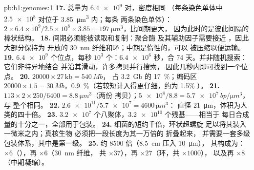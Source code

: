 \begin{solution}{pb:b1:genomes:1}
\textbf{17.}  总量为 $\num{6.4e9}$ 对，密度相同
（每条染色单体中 $\num{2.5e8}$ 对位于 \qty{3.85}{\micro m^3} 内；每条
两条染色单体）：$2\times 6.4\times 10^9/2.5\times 10^8\times
3.85 = \qty{197}{\micro m^3}$，比间期更大，
因为此时的是彼此间隔的棒状结构。
\textbf{18.} 间期必须能被读取和复制：聚合酶
及其辅助因子需要接近 ，因此大部分保持为
开放的 \qty{30}{nm} 纤维和环；中期是惰性的，可以
被压缩以便运输。
\textbf{19.} $\num{6.4e9}$ 个位点，每秒 $10^3$ 个：$\num{6.4e6}$
秒，合 74 天。并非随机搜索：它们非特异地结合 
并沿其滑动，许多拷贝并行搜索，
因此几秒内即可找到一个位点。
\textbf{20.} $\num{20000}\times 27\,\mathrm{kb} = \qty{540}{Mb}$，
占 \qty{3.2}{Gb} 的 \qty{17}{\%}；编码区 $\num{20000}\times 1.5 =
\qty{30}{Mb}$，\qty{0.9}{\%}（若较短计入得更仔细，约为 1.5\%
）。
\textbf{21.} $113\times 2\times 250/6400 = \qty{8.8}{\micro m^3}$（两份
拷贝）；$\num{5e8}/8.8 = \qty{5.7e7}{bp/\micro m^3}$，与
整个相同。
\textbf{22.} $\num{2.6e11}/\num{5.7e7} = \qty{4600}{\micro m^3}$：
直径 \qty{21}{\micro m}，体积为人类的四十倍。
\textbf{23.} $\num{3.2e7}$ 个八聚体，$\num{3.2e10}$ 个残基——相当于
每日合成量的十分之一，全部用于包装。
\textbf{24.} 细菌的短约千倍，环状超螺旋
足以将其装入一微米之内；真核生物
必须把一段长度为其一万倍的  折叠起来，
并需要一套多级包装体系，其中是第一级。
\textbf{25.} 约 \num{8500} 倍（\qty{8.5}{cm} 压入 \qty{10}{\micro m}），
其构成为：$\times 6$（），再 $\times 6$（\qty{30}{nm} 纤维，
共 $\times 37$），再 $\times 27$（环，共 $\times 1000$），
以及再 $\times 8$（中期凝缩）。
\end{solution}
